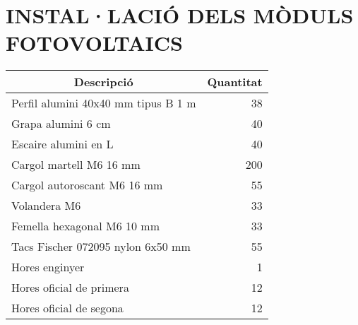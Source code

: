 \chapter{\uppercase{Instal·lació dels mòduls fotovoltaics}}

\begin{table}[H]
  \begin{center}
    \begin{tabularx} {\textwidth} {|X|r|} \hline
  \multicolumn{1}{|c|}{Descripció} &  \multicolumn{1}{c|}{Quantitat}\\ \hline \hline
    Perfil alumini 40x40 mm tipus B 1 m & 38 \\ \hline
    Grapa alumini 6 cm & 40 \\ \hline
    Escaire alumini en L & 40 \\ \hline
    Cargol martell M6 16 mm & 200 \\ \hline
    Cargol autoroscant M6 16 mm & 55 \\ \hline
    Volandera M6 & 33 \\ \hline
    Femella hexagonal M6 10 mm & 33 \\ \hline
    Tacs Fischer 072095 nylon 6x50 mm & 55 \\ \hline
        Hores enginyer & 1 \\ \hline
    Hores oficial de primera & 12 \\ \hline
    Hores oficial de segona & 12 \\ \hline
    \end{tabularx}%
  \end{center}

  \label{tab:addlabel}%
\end{table}%



\clearpage
